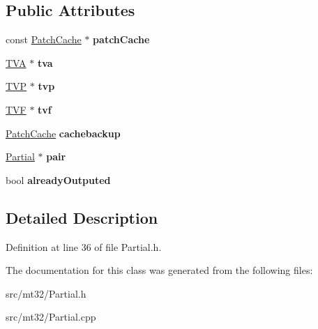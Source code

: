 \subsection*{Public Attributes}
\begin{DoxyCompactItemize}
\item 
\hypertarget{classMT32Emu_1_1Partial_a08f0b9690aa5cb80a69b45c9eb9fef45}{const \hyperlink{structMT32Emu_1_1PatchCache}{Patch\-Cache} $\ast$ {\bfseries patch\-Cache}}\label{classMT32Emu_1_1Partial_a08f0b9690aa5cb80a69b45c9eb9fef45}

\item 
\hypertarget{classMT32Emu_1_1Partial_a77861c7710293d7f2e07793e1abc7612}{\hyperlink{classMT32Emu_1_1TVA}{T\-V\-A} $\ast$ {\bfseries tva}}\label{classMT32Emu_1_1Partial_a77861c7710293d7f2e07793e1abc7612}

\item 
\hypertarget{classMT32Emu_1_1Partial_acb800e6656bc33d86db28937d42695ee}{\hyperlink{classMT32Emu_1_1TVP}{T\-V\-P} $\ast$ {\bfseries tvp}}\label{classMT32Emu_1_1Partial_acb800e6656bc33d86db28937d42695ee}

\item 
\hypertarget{classMT32Emu_1_1Partial_aa5bad3e2d2ccce57b595fc304d7e8382}{\hyperlink{classMT32Emu_1_1TVF}{T\-V\-F} $\ast$ {\bfseries tvf}}\label{classMT32Emu_1_1Partial_aa5bad3e2d2ccce57b595fc304d7e8382}

\item 
\hypertarget{classMT32Emu_1_1Partial_a6455991dddfe4281fc2deb8fc676bfe4}{\hyperlink{structMT32Emu_1_1PatchCache}{Patch\-Cache} {\bfseries cachebackup}}\label{classMT32Emu_1_1Partial_a6455991dddfe4281fc2deb8fc676bfe4}

\item 
\hypertarget{classMT32Emu_1_1Partial_aa784f5e14132bf8f9471c6e968db5f5e}{\hyperlink{classMT32Emu_1_1Partial}{Partial} $\ast$ {\bfseries pair}}\label{classMT32Emu_1_1Partial_aa784f5e14132bf8f9471c6e968db5f5e}

\item 
\hypertarget{classMT32Emu_1_1Partial_a3c99c40c88aa9b33aa86a3752fc1977e}{bool {\bfseries already\-Outputed}}\label{classMT32Emu_1_1Partial_a3c99c40c88aa9b33aa86a3752fc1977e}

\end{DoxyCompactItemize}


\subsection{Detailed Description}


Definition at line 36 of file Partial.\-h.



The documentation for this class was generated from the following files\-:\begin{DoxyCompactItemize}
\item 
src/mt32/Partial.\-h\item 
src/mt32/Partial.\-cpp\end{DoxyCompactItemize}
